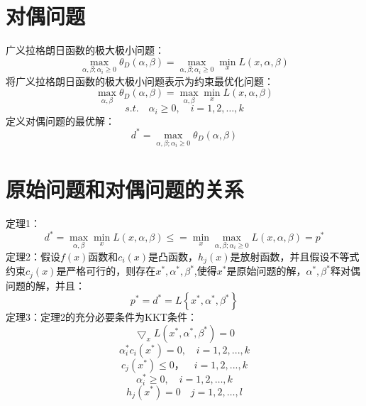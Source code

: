 \documentclass{article}
\begin{document}
	\section{对偶问题}
	广义拉格朗日函数的极大极小问题：
	\begin{equation}
	\mathop{max}_{\alpha ,\beta ;\alpha _{i}\geq 0}\theta_{D}\left (  \alpha ,\beta \right )=\mathop{max}_{\alpha ,\beta ;\alpha _{i}\geq 0}\mathop{min}_{x}L\left ( x,\alpha ,\beta  \right )
	\end{equation}
	将广义拉格朗日函数的极大极小问题表示为约束最优化问题：
	\begin{equation}
	\mathop{max}_{\alpha ,\beta }\theta_{D}\left (  \alpha ,\beta \right )=\mathop{max}_{\alpha ,\beta }\mathop{min}_{x}L\left ( x,\alpha ,\beta  \right )
	\end{equation}
	\begin{equation}
	s.t. \quad \alpha _{i}\geq 0 , \quad i=1,2,\ldots,k
	\end{equation}
	定义对偶问题的最优解：
	\begin{equation}
	d^{*}=\mathop{max}_{\alpha ,\beta ;\alpha _{i}\geq 0}\theta _{D}\left ( \alpha ,\beta  \right )
	\end{equation}
	\section{原始问题和对偶问题的关系}
	\noindent 定理1：
	\begin{equation}
	d^{*}=\mathop{max}_{\alpha ,\beta }\mathop{min}_{x}L\left ( x,\alpha ,\beta  \right )\leq =\mathop{min}_{x}\mathop{max}_{\alpha ,\beta ;\alpha _{i}\geq 0}L\left ( x,\alpha ,\beta  \right )=p^{*}
	\end{equation}
	定理2：假设$f(x)$函数和$c_{i}(x)$是凸函数，$h_{j}(x)$是放射函数，并且假设不等式约束$c_{j}(x)$是严格可行的，则存在$x^{*},\alpha ^{*},\beta ^{*}$,使得$x^{*}$是原始问题的解，$\alpha ^{*},\beta ^{*}$释对偶问题的解，并且：
	\begin{equation}
	p^{*}=d^{*}=L\left \{ x^{*},\alpha ^{*},\beta ^{*} \right \}
	\end{equation}
	定理3：定理2的充分必要条件为KKT条件：
	\begin{equation}
	\bigtriangledown _{x}L\left ( x^{*},\alpha ^{*},\beta ^{*} \right )=0
	\end{equation}
	\begin{equation}
	\alpha _{i}^{*}c_{i}\left ( x^{*} \right )=0,\quad i=1,2,...,k
	\end{equation}
	\begin{equation}
	c_{j}\left ( x^{*} \right )\leq 0 ，\quad i=1,2,...,k
	\end{equation}
	\begin{equation}
	\alpha _{i}^{*}\geq 0, \quad i=1,2,\ldots,k
	\end{equation}
	\begin{equation}
	h_{j}\left ( x^{*} \right )=0 \quad j=1,2,\ldots,l
	\end{equation}
\end{document}
